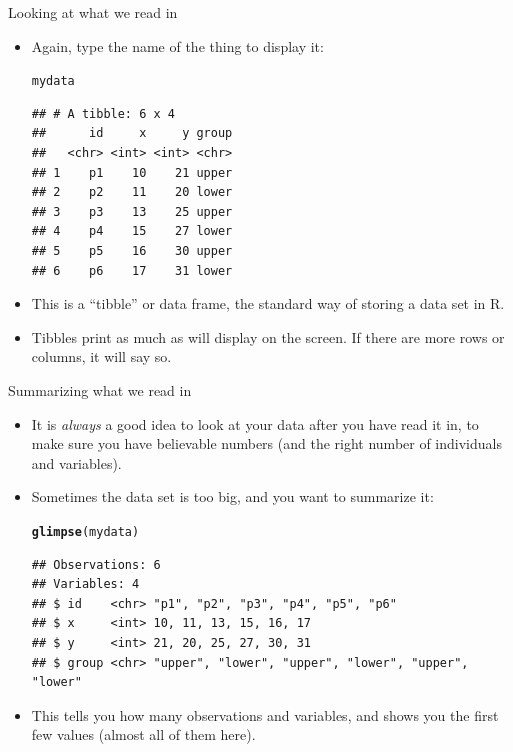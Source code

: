 \documentclass[unknownkeysallowed]{beamer}\usepackage[]{graphicx}\usepackage[]{color}
\makeatletter
\newcommand{\hlstd}[1]{\textcolor[rgb]{0.345,0.345,0.345}{#1}}%
\newcommand{\hlkwd}[1]{\textcolor[rgb]{0.737,0.353,0.396}{\textbf{#1}}}%
\newenvironment{kframe}{%
 \def\at@end@of@kframe{}%
 \ifinner\ifhmode%
  \def\at@end@of@kframe{\end{minipage}}%
  \begin{minipage}{\columnwidth}%
 \fi\fi%
 \def\FrameCommand##1{\hskip\@totalleftmargin \hskip-\fboxsep
 \colorbox{shadecolor}{##1}\hskip-\fboxsep
     \hskip-\linewidth \hskip-\@totalleftmargin \hskip\columnwidth}%
 \MakeFramed {\advance\hsize-\width
   \@totalleftmargin\z@ \linewidth\hsize
   \@setminipage}}%
 {\par\unskip\endMakeFramed%
 \at@end@of@kframe}
\newenvironment{knitrout}{}{} %
\makeatother
\begin{document}
\begin{frame}[fragile]{Looking at what we read in}
  
  \begin{itemize}
\item Again, type the name of the thing to display it:
  
\begin{knitrout}
\color{fgcolor}\begin{kframe}
\begin{alltt}
\hlstd{mydata}
\end{alltt}
\begin{verbatim}
## # A tibble: 6 x 4
##      id     x     y group
##   <chr> <int> <int> <chr>
## 1    p1    10    21 upper
## 2    p2    11    20 lower
## 3    p3    13    25 upper
## 4    p4    15    27 lower
## 5    p5    16    30 upper
## 6    p6    17    31 lower
\end{verbatim}
\end{kframe}
\end{knitrout}

\item This is a ``tibble'' or data frame, the standard way of storing
  a data set in R.
\item Tibbles print as much as will display on the screen. If there
  are more rows or columns, it will say so.
  \end{itemize}
  
\end{frame}

\begin{frame}[fragile]{Summarizing what we read in}
  
  \begin{itemize}
  \item It is \emph{always} a good idea to look at your data after you
    have read it in, to make sure you have believable numbers (and the
    right number of individuals and variables). 
  \item Sometimes the data set is too big, and you want to summarize it:
    
\begin{knitrout}
\color{fgcolor}\begin{kframe}
\begin{alltt}
\hlkwd{glimpse}\hlstd{(mydata)}
\end{alltt}
\begin{verbatim}
## Observations: 6
## Variables: 4
## $ id    <chr> "p1", "p2", "p3", "p4", "p5", "p6"
## $ x     <int> 10, 11, 13, 15, 16, 17
## $ y     <int> 21, 20, 25, 27, 30, 31
## $ group <chr> "upper", "lower", "upper", "lower", "upper", "lower"
\end{verbatim}
\end{kframe}
\end{knitrout}

\item This tells you how many observations and variables, and shows
  you the first few values (almost all of them here).
  \end{itemize}
  
\end{frame}
\end{document}
